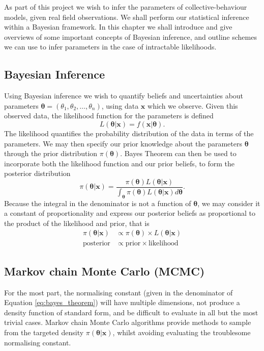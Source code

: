 As part of this project we wish to infer the parameters of collective-behaviour models, given real field observations. We shall perform our statistical inference within a Bayesian framework. In this chapter we shall introduce and give overviews of some important concepts of Bayesian inference, and outline schemes we can use to infer parameters in the case of intractable likelihoods.

\subsection{Bayesian Inference}
\label{ssec:bayes}

Using Bayesian inference we wish to quantify beliefs and uncertainties about parameters $\bm{\theta} = (\theta_1, \theta_2,\dots,\theta_n)$, using data $\bm{x}$ which we observe. Given this observed data, the likelihood function for the parameters is defined
\[
    L(\bm{\theta}|\bm{x}) = f(\bm{x}|\bm{\theta}).
\]
The likelihood quantifies the probability distribution of the data in terms of the parameters. We may then specify our prior knowledge about the parameters $\bm{\theta}$ through the prior distribution $\pi(\bm{\theta})$. Bayes Theorem can then be used to incorporate both the likelihood function and our prior beliefs, to form the posterior distribution
\begin{equation}
\label{eq:bayes_theorem}
    \pi(\bm{\theta}|\bm{x}) = \frac{\pi({\bm{\theta}})L(\bm{\theta}|\bm{x})}{\int_{\bm{\theta}} \pi(\bm{\theta})L(\bm{\theta}|\bm{x})d\bm{\theta}}.
\end{equation}
Because the integral in the denominator is not a function of $\bm{\theta}$, we may consider it a constant of proportionality and express our posterior beliefs as proportional to the product of the likelihood and prior, that is
\begin{align*}
    \pi(\bm{\theta}|\bm{x}) &\propto \pi(\bm{\theta}) \times L(\bm{\theta}|\bm{x})\\
    \text{posterior} &\propto \text{prior} \times \text{likelihood}
\end{align*}

\subsection{Markov chain Monte Carlo (MCMC)}
\label{ssec:mcmc}

For the most part, the normalising constant (given in the denominator of Equation \eqref{eq:bayes_theorem}) will have multiple dimensions, not produce a density function of standard form, and be difficult to evaluate in all but the most trivial cases. Markov chain Monte Carlo algorithms provide methods to sample from the targeted density $\pi(\bm{\theta}|\bm{x})$, whilst avoiding evaluating the troublesome normalising constant.

